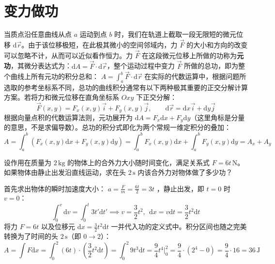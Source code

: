 
\section{变力做功}

当质点沿任意曲线从点 $a$ 运动到点 $b$ 时，我们在轨道上截取一段无限短的微元位移 $\mathrm{d}\vec{r}$。由于该位移极短，在此极其微小的空间邻域内，力 $\vec{F}$ 的大小和方向的改变可以忽略不计，从而可以近似看作恒力。力 $\vec{F}$ 在这段微元位移上所做的功称为\textbf{元功}，其微分表达式为：$\mathrm{d}A = \vec{F} \cdot \mathrm{d}\vec{r}$，整个运动过程中变力 $\vec{F}$ 所做的总功，即为整个曲线上所有元功的积分总和：
 \(A = \int_{a}^{b} \vec{F} \cdot \mathrm{d}\vec{r}\) 
在实际的代数运算中，根据问题所选取的参考坐标系不同，总功的曲线积分通常有以下两种极其重要的正交分解计算方案。若将力和微元位移在直角坐标系 $Oxy$ 下正交分解：
\[
\vec{F}(x, y) = F_x(x, y)\vec{i} + F_y(x, y)\vec{j}, \qquad \mathrm{d}\vec{r} = \mathrm{d}x\vec{i} + \mathrm{d}y\vec{j}
\]
根据向量点积的代数运算法则，元功展开为 $\mathrm{d}A = F_x\mathrm{d}x + F_y\mathrm{d}y$（这里角标是分量的意思，不是求偏导数）。总功的积分式即化为两个常规一维定积分的叠加：
\[
A = \int_{a}^{b} \left( F_x(x, y)\mathrm{d}x + F_y(x, y)\mathrm{d}y \right) = \int_{a}^{b} F_x(x, y)\mathrm{d}x + \int_{a}^{b} F_y(x, y)\mathrm{d}y = A_x + A_y
\]

\begin{exercise}
设作用在质量为 $2\,\text{kg}$ 的物体上的合外力大小随时间变化，满足关系式 $F = 6t\,\text{N}$。如果物体由静止出发沿直线运动，求在头 $2\,\text{s}$ 内该合外力对物体做了多少功？
\end{exercise}
\begin{solution}
首先求出物体的瞬时加速度大小： \(a = \frac{F}{m} = \frac{6t}{2} = 3t\) ，静止出发，即 $t=0$ 时 $v=0$：
$$\int_{0}^{v} \mathrm{d}v = \int_{0}^{t} 3t' \mathrm{d}t' \implies v = \frac{3}{2}t^2,~~\mathrm{d}x = v\mathrm{d}t = \frac{3}{2}t^2\mathrm{d}t$$将力 $F = 6t$ 以及位移元 $\mathrm{d}x = \frac{3}{2}t^2\mathrm{d}t$ 一并代入功的定义式中。积分区间也随之完美转换为了时间的头 $2\,\text{s}$（即 $0 \to 2$）：$$A = \int F \mathrm{d}x = \int_{0}^{2} (6t) \cdot \left(\frac{3}{2}t^2\mathrm{d}t\right)=\int_{0}^{2} 9t^3 \mathrm{d}t = \frac{9}{4}t^4 \Big|_0^2 = \frac{9}{4} \cdot (2^4 - 0) = \frac{9}{4} \cdot 16 = 36\,\text{J}$$
\end{solution}

